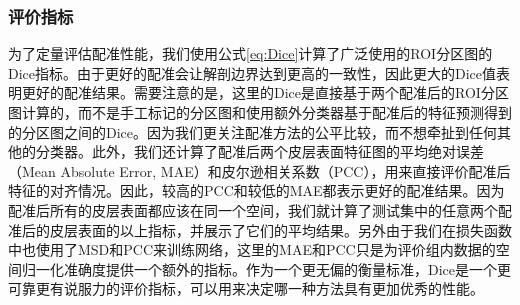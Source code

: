 \subsubsection{评价指标}\label{sec:配准的评价指标}
为了定量评估配准性能，我们使用公式\ref{eq:Dice}计算了广泛使用的ROI分区图的Dice指标。由于更好的配准会让解剖边界达到更高的一致性，因此更大的Dice值表明更好的配准结果。需要注意的是，这里的Dice是直接基于两个配准后的ROI分区图计算的，而不是手工标记的分区图和使用额外分类器基于配准后的特征预测得到的分区图之间的Dice。因为我们更关注配准方法的公平比较，而不想牵扯到任何其他的分类器。此外，我们还计算了配准后两个皮层表面特征图的平均绝对误差（Mean Absolute Error, MAE）和皮尔逊相关系数（PCC），用来直接评价配准后特征的对齐情况。因此，较高的PCC和较低的MAE都表示更好的配准结果。因为配准后所有的皮层表面都应该在同一个空间，我们就计算了测试集中的任意两个配准后的皮层表面的以上指标，并展示了它们的平均结果。另外由于我们在损失函数中也使用了MSD和PCC来训练网络，这里的MAE和PCC只是为评价组内数据的空间归一化准确度提供一个额外的指标。作为一个更无偏的衡量标准，Dice是一个更可靠更有说服力的评价指标，可以用来决定哪一种方法具有更加优秀的性能\cite{rohlfing2011image}。

